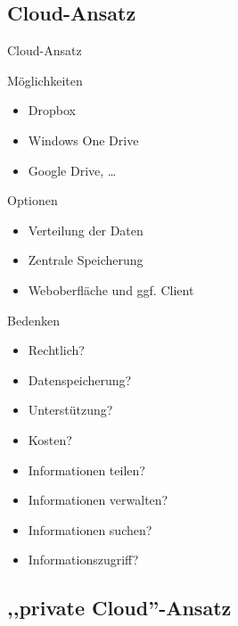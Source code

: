 \documentclass{beamer}
\begin{document}
\subsection{Cloud-Ansatz}


\begin{frame}[shrink]{Cloud-Ansatz}
	
	\begin{block}{Möglichkeiten}
		\begin{itemize}
			\item Dropbox 
			\item Windows One Drive
			\item Google Drive, \ldots
		\end{itemize}
		
	\end{block}
	 
	
	
	\begin{block}{Optionen}
		\begin{itemize}
			\item Verteilung der Daten
			\item Zentrale Speicherung
			\item Weboberfläche und ggf. Client
		\end{itemize}
		
		
	\end{block}
	
	
	\begin{block}{Bedenken}
		\begin{multicols}{2}
			\begin{itemize}
				\item Rechtlich? 
				\item Datenspeicherung?
				\item Unterstützung?
				\item Kosten?
				\item Informationen teilen?
				\item Informationen verwalten?
				\item Informationen suchen?
				\item Informationszugriff?
			\end{itemize}		
		\end{multicols}
	\end{block}
	
	\bigskip
	
\end{frame}




\subsection{,,private Cloud''-Ansatz}
\end{document}
